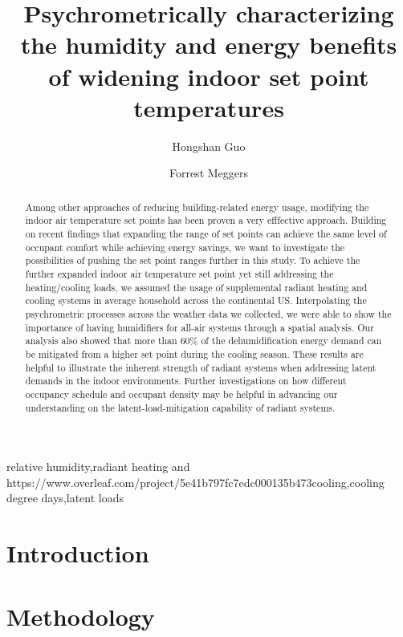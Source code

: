\documentclass[review]{elsarticle}
\begin{document}
\begin{frontmatter}
\title{Psychrometrically characterizing the humidity and energy benefits of widening indoor set point temperatures}
\author[mysecondaryaddress]{Hongshan Guo}
\author[mymainaddress,mysecondaryaddress]{Forrest Meggers}
\address[mymainaddress]{School of Architecture, Princeton University, USA}
\address[mysecondaryaddress]{Andlinger Center for Energy and the Environment, Princeton University, USA.}
\begin{abstract}
Among other approaches of reducing building-related energy usage, modifying the indoor air temperature set points has been proven a very efffective approach. Building on recent findings that expanding the range of set points can achieve the same level of occupant comfort while achieving energy savings, we want to investigate the possibilities of pushing the set point ranges further in this study. To achieve the further expanded indoor air temperature set point yet still addressing the heating/cooling loads, we assumed the usage of supplemental radiant heating and cooling systems in average household across the continental US. Interpolating the psychrometric processes across the weather data we collected, we were able to show the importance of having humidifiers for all-air systems through a spatial analysis. Our analysis also showed that more than 60\% of the dehumidification energy demand can be mitigated from a higher set point during the cooling season. These results are helpful to illustrate the inherent strength of radiant systems when addressing latent demands in the indoor environments. Further investigations on how different occupancy schedule and occupant density may be helpful in advancing our understanding on the latent-load-mitigation capability of radiant systems.
\end{abstract}
\begin{keyword}relative humidity\sep radiant heating and https://www.overleaf.com/project/5e41b797fc7edc000135b473cooling\sep cooling degree days\sep latent loads\end{keyword}\end{frontmatter}
\tableofcontents
\section{Introduction}

\section{Methodology}
\end{document}

